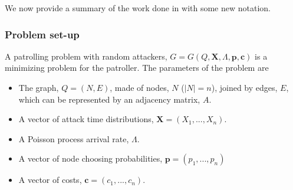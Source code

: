 \documentclass[a4paper,10pt]{article}
\theoremstyle{definition}
\theoremstyle{definition}
\theoremstyle{remark}
\theoremstyle{definition}
\begin{document}
We now provide a summary of the work done in \cite{Lin2013} with some new notation.

\subsubsection{Problem set-up}
A patrolling problem with random attackers, $G=G(Q,\bm{X},\Lambda,\bm{p},\bm{c})$ is a minimizing problem for the patroller. The parameters of the problem are

\begin{itemize}
\item The graph, $Q=(N,E)$, made of nodes, $N$ ($|N|=n$), joined by edges, $E$, which can be represented by an adjacency matrix, $A$.
\item A vector of attack time distributions, $\bm{X}=(X_{1},...,X_{n})$.
\item A Poisson process arrival rate, $\Lambda$.
\item A vector of node choosing probabilities, $\bm{p}=(p_{1},...,p_{n})$
\item A vector of costs, $\bm{c}=(c_{1},...,c_{n})$.
\end{itemize}
\end{document}
